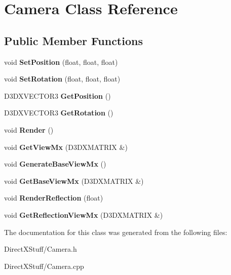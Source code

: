 \hypertarget{class_camera}{\section{Camera Class Reference}
\label{class_camera}
}
\subsection*{Public Member Functions}
\begin{DoxyCompactItemize}
\item 
\hypertarget{class_camera_adb7da03e1b2721c6a606c4c8ec568b34}{void {\bfseries Set\-Position} (float, float, float)}\label{class_camera_adb7da03e1b2721c6a606c4c8ec568b34}

\item 
\hypertarget{class_camera_a76c3432865a0030912e06ecbd7453efb}{void {\bfseries Set\-Rotation} (float, float, float)}\label{class_camera_a76c3432865a0030912e06ecbd7453efb}

\item 
\hypertarget{class_camera_afad629e82130861900ab897e973fc40c}{D3\-D\-X\-V\-E\-C\-T\-O\-R3 {\bfseries Get\-Position} ()}\label{class_camera_afad629e82130861900ab897e973fc40c}

\item 
\hypertarget{class_camera_ac4f6ca2d0bcdf381dc0ab96d764acc12}{D3\-D\-X\-V\-E\-C\-T\-O\-R3 {\bfseries Get\-Rotation} ()}\label{class_camera_ac4f6ca2d0bcdf381dc0ab96d764acc12}

\item 
\hypertarget{class_camera_ab99417d5df5a3126910d9b027a9af24b}{void {\bfseries Render} ()}\label{class_camera_ab99417d5df5a3126910d9b027a9af24b}

\item 
\hypertarget{class_camera_a7d40b44b6e6b74f47567505130cf875d}{void {\bfseries Get\-View\-Mx} (D3\-D\-X\-M\-A\-T\-R\-I\-X \&)}\label{class_camera_a7d40b44b6e6b74f47567505130cf875d}

\item 
\hypertarget{class_camera_ab94754743908c98c9efc65d2fcadf92f}{void {\bfseries Generate\-Base\-View\-Mx} ()}\label{class_camera_ab94754743908c98c9efc65d2fcadf92f}

\item 
\hypertarget{class_camera_a2271a6e264b82d5d6754a8e86f008403}{void {\bfseries Get\-Base\-View\-Mx} (D3\-D\-X\-M\-A\-T\-R\-I\-X \&)}\label{class_camera_a2271a6e264b82d5d6754a8e86f008403}

\item 
\hypertarget{class_camera_a56e38106d417c91c9e049c01056d04ac}{void {\bfseries Render\-Reflection} (float)}\label{class_camera_a56e38106d417c91c9e049c01056d04ac}

\item 
\hypertarget{class_camera_a6458c64b8bfff67169747ddf89783cab}{void {\bfseries Get\-Reflection\-View\-Mx} (D3\-D\-X\-M\-A\-T\-R\-I\-X \&)}\label{class_camera_a6458c64b8bfff67169747ddf89783cab}

\end{DoxyCompactItemize}


The documentation for this class was generated from the following files\-:\begin{DoxyCompactItemize}
\item 
Direct\-X\-Stuff/Camera.\-h\item 
Direct\-X\-Stuff/Camera.\-cpp\end{DoxyCompactItemize}
